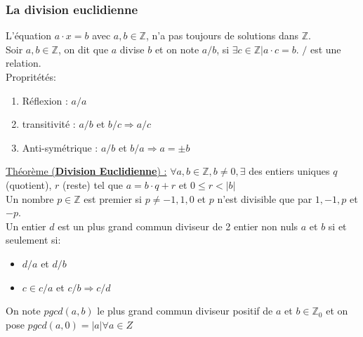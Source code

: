 \documentclass[11pt]{article}
\begin{document}
		\subsubsection{La division euclidienne}
			L'équation $a \cdot x = b$ avec $a, b \in \mathbb Z$, n'a pas toujours de solutions dans $\mathbb Z$.\\
			Soir $a, b \in \mathbb Z$, on dit que $a$ divise $b$ et on note $a/b$, si $\exists c \in \mathbb Z | a \cdot c = b$. $/$ est une relation.\\
			Propritétés:
			\begin{enumerate}
				\item Réflexion : $a/a$
				\item transitivité : $a/b$ et $b/c \Rightarrow a/c$
				\item Anti-symétrique : $a/b$ et $b/a \Rightarrow a = \pm b$ 
			\end{enumerate}
			\underline{Théorème (\textbf{Division Euclidienne}) :} $\forall a, b \in \mathbb Z, b \neq 0, \exists$ des entiers uniques $q$ (quotient), $r$ (reste) tel que $a = b \cdot q + r$ et $0 \leq r < |b|$\\

			Un nombre $p \in \mathbb Z$ est premier si $p \neq -1, 1, 0$ et $p$ n'est divisible que par $1, -1, p$ et $-p$.\\

			Un entier $d$ est un plus grand commun diviseur de 2 entier non nuls $a$ et $b$ si et seulement si:
			\begin{itemize}
				\item $d / a$ et $d / b$
				\item $c \in c / a$ et $c / b \Rightarrow c / d$
			\end{itemize}
			On note $pgcd(a, b)$ le plus grand commun diviseur positif de $a$ et $b \in \mathbb Z_0$ et on pose $pgcd(a, 0) = |a| \forall a \in Z$\\
\end{document}
